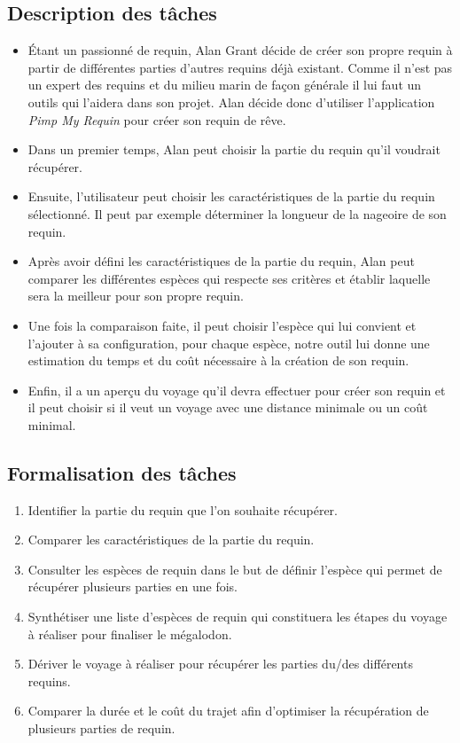 \documentclass{article}
\begin{document}
\subsection{Description des tâches}
\begin{itemize}
	\item Étant un passionné de requin, Alan Grant décide de créer son propre requin à partir de différentes parties d'autres requins déjà existant. Comme il n'est pas un expert des requins et du milieu marin de façon générale il lui faut un outils qui l'aidera dans son projet. Alan décide donc d'utiliser l'application \textit{Pimp My Requin} pour créer son requin de rêve.
	\item Dans un premier temps, Alan peut choisir la partie du requin qu'il voudrait récupérer.
	\item Ensuite, l'utilisateur peut choisir les caractéristiques de la partie du requin sélectionné. Il peut par exemple déterminer la longueur de la nageoire de son requin.
	\item Après avoir défini les caractéristiques de la partie du requin, Alan peut comparer les différentes espèces qui respecte ses critères et établir laquelle sera la meilleur pour son propre requin.
	\item Une fois la comparaison faite, il peut choisir l'espèce qui lui convient et l'ajouter à sa configuration, pour chaque espèce, notre outil lui donne une estimation du temps et du coût nécessaire à la création de son requin.
	\item Enfin, il a un aperçu du voyage qu'il devra effectuer pour créer son requin et il peut choisir si il veut un voyage avec une distance minimale ou un coût minimal.
\end{itemize}

\subsection{Formalisation des tâches}
\begin{enumerate}
	\item Identifier la partie du requin que l’on souhaite récupérer.
	\item Comparer les caractéristiques de la partie du requin.
	\item Consulter les espèces de requin dans le but de définir l’espèce qui permet de récupérer plusieurs parties en une fois.
	\item Synthétiser une liste d’espèces de requin qui constituera les étapes du voyage à réaliser pour finaliser le mégalodon.
	\item Dériver le voyage à réaliser pour récupérer les parties du/des différents requins.
	\item Comparer la durée et le coût du trajet afin d’optimiser la récupération de plusieurs parties de requin.
\end{enumerate}
\end{document}
